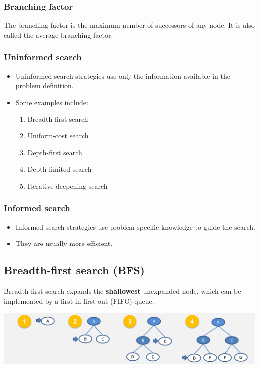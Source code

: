\documentclass[11pt]{article}
\begin{document}
\subsubsection{Branching factor}
\label{sec:org504002a}
The branching factor is the maximum number of successors of any node. It is also called the average branching factor.
\subsubsection{Uninformed search}
\label{sec:orgaba991b}
\begin{itemize}
\item Uninformed search strategies use only the information available in the problem definition.
\item Some examples include:
\begin{enumerate}
\item Breadth-first search
\item Uniform-cost search
\item Depth-first search
\item Depth-limited search
\item Iterative deepening search
\end{enumerate}
\end{itemize}
\subsubsection{Informed search}
\label{sec:orge11f01a}
\begin{itemize}
\item Informed search strategies use problem-specific knowledge to guide the search.
\item They are usually more efficient.
\end{itemize}
\subsection{Breadth-first search (BFS)}
\label{sec:orgf6af7d7}
Breadth-first search expands the \textbf{shallowest} unexpanded node, which can be implemented by a first-in-first-out (FIFO) queue.

\begin{center}
\includegraphics[width=.9\linewidth]{./images/breadth-first-search-diagram.png}
\end{center}
\end{document}
